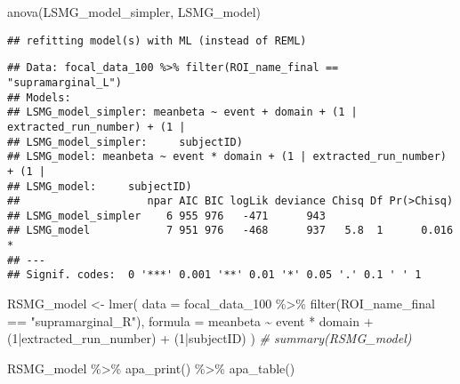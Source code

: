 \documentclass[
]{article}
\newenvironment{Shaded}{\begin{snugshade}}{\end{snugshade}}
\newcommand{\AttributeTok}[1]{\textcolor[rgb]{0.77,0.63,0.00}{#1}}
\newcommand{\CommentTok}[1]{\textcolor[rgb]{0.56,0.35,0.01}{\textit{#1}}}
\newcommand{\DecValTok}[1]{\textcolor[rgb]{0.00,0.00,0.81}{#1}}
\newcommand{\FunctionTok}[1]{\textcolor[rgb]{0.00,0.00,0.00}{#1}}
\newcommand{\NormalTok}[1]{#1}
\newcommand{\OtherTok}[1]{\textcolor[rgb]{0.56,0.35,0.01}{#1}}
\newcommand{\SpecialCharTok}[1]{\textcolor[rgb]{0.00,0.00,0.00}{#1}}
\newcommand{\StringTok}[1]{\textcolor[rgb]{0.31,0.60,0.02}{#1}}
\begin{document}
\begin{Shaded}
\begin{Highlighting}[]
\FunctionTok{anova}\NormalTok{(LSMG\_model\_simpler, LSMG\_model)}
\end{Highlighting}
\end{Shaded}

\begin{verbatim}
## refitting model(s) with ML (instead of REML)
\end{verbatim}

\begin{verbatim}
## Data: focal_data_100 %>% filter(ROI_name_final == "supramarginal_L")
## Models:
## LSMG_model_simpler: meanbeta ~ event + domain + (1 | extracted_run_number) + (1 | 
## LSMG_model_simpler:     subjectID)
## LSMG_model: meanbeta ~ event * domain + (1 | extracted_run_number) + (1 | 
## LSMG_model:     subjectID)
##                    npar AIC BIC logLik deviance Chisq Df Pr(>Chisq)  
## LSMG_model_simpler    6 955 976   -471      943                      
## LSMG_model            7 951 976   -468      937   5.8  1      0.016 *
## ---
## Signif. codes:  0 '***' 0.001 '**' 0.01 '*' 0.05 '.' 0.1 ' ' 1
\end{verbatim}

\begin{Shaded}
\begin{Highlighting}[]
\NormalTok{RSMG\_model }\OtherTok{\textless{}{-}} \FunctionTok{lmer}\NormalTok{(}
      \AttributeTok{data =}\NormalTok{ focal\_data\_100 }\SpecialCharTok{\%\textgreater{}\%} \FunctionTok{filter}\NormalTok{(ROI\_name\_final }\SpecialCharTok{==} \StringTok{"supramarginal\_R"}\NormalTok{),}
      \AttributeTok{formula =}\NormalTok{ meanbeta }\SpecialCharTok{\textasciitilde{}}\NormalTok{ event }\SpecialCharTok{*}\NormalTok{ domain }\SpecialCharTok{+}\NormalTok{ (}\DecValTok{1}\SpecialCharTok{|}\NormalTok{extracted\_run\_number) }\SpecialCharTok{+}\NormalTok{ (}\DecValTok{1}\SpecialCharTok{|}\NormalTok{subjectID)}
\NormalTok{    )}
\CommentTok{\# summary(RSMG\_model)}

\NormalTok{RSMG\_model }\SpecialCharTok{\%\textgreater{}\%}
  \FunctionTok{apa\_print}\NormalTok{() }\SpecialCharTok{\%\textgreater{}\%}
  \FunctionTok{apa\_table}\NormalTok{()}
\end{Highlighting}
\end{Shaded}
\end{document}
